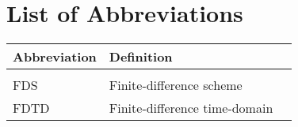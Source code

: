 \chapter{List of Abbreviations}
{\renewcommand{\arraystretch}{1.1}
\begin{tabular}{ p{3cm} p{7cm} p{4cm}  }
 Abbreviation & Definition\\
 \hline\\
 FDS & Finite-difference scheme\\
 FDTD & Finite-difference time-domain
\end{tabular}}
